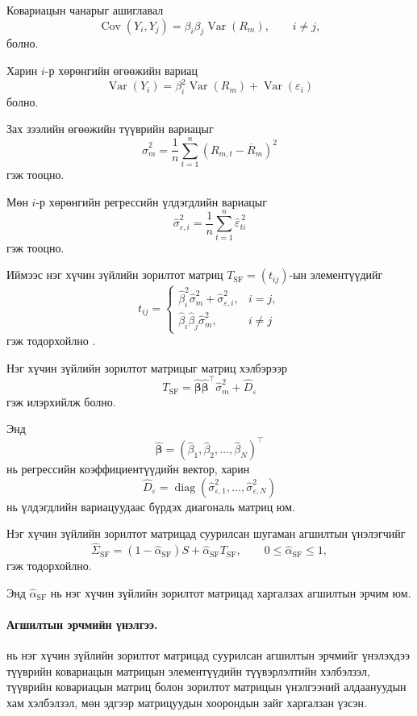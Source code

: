Ковариацын чанарыг ашиглавал
\[
\operatorname{Cov}(Y_i,Y_j)
=
\beta_i\beta_j\operatorname{Var}(R_m),
\qquad i\neq j,
\]
болно.

Харин $i$-р хөрөнгийн өгөөжийн вариац
\[
\operatorname{Var}(Y_i)
=
\beta_i^2\operatorname{Var}(R_m)
+
\operatorname{Var}(\varepsilon_i)
\]
болно.

Зах зээлийн өгөөжийн түүврийн вариацыг
\[
\widehat{\sigma}_m^2
=
\frac{1}{n}
\sum_{t=1}^{n}
(R_{m,t}-\overline{R}_m)^2
\]
гэж тооцно.

Мөн $i$-р хөрөнгийн регрессийн үлдэгдлийн
вариацыг
\[
\widehat{\sigma}_{\varepsilon,i}^{2}
=
\frac{1}{n}
\sum_{t=1}^{n}
\widehat{\varepsilon}_{ti}^{\,2}
\]
гэж тооцно.

Иймээс нэг хүчин зүйлийн зорилтот матриц
$T_{\mathrm{SF}}=(t_{ij})$-ын элементүүдийг
\[
t_{ij}
=
\begin{cases}
	\widehat{\beta}_i^2\widehat{\sigma}_m^2
	+
	\widehat{\sigma}_{\varepsilon,i}^{2},
	& i=j,\\[0.4em]
	\widehat{\beta}_i\widehat{\beta}_j
	\widehat{\sigma}_m^2,
	& i\neq j
\end{cases}
\]
гэж тодорхойлно \citep{ledoitwolf2003}.

Нэг хүчин зүйлийн зорилтот матрицыг матриц
хэлбэрээр
\[
T_{\mathrm{SF}}
=
\widehat{\boldsymbol{\beta}}
\widehat{\boldsymbol{\beta}}^{\top}
\widehat{\sigma}_m^2
+
\widehat D_{\varepsilon}
\]
гэж илэрхийлж болно.

Энд
\[
\widehat{\boldsymbol{\beta}}
=
(\widehat{\beta}_1,
\widehat{\beta}_2,
\ldots,
\widehat{\beta}_N)^{\top}
\]
нь регрессийн коэффициентүүдийн вектор, харин
\[
\widehat D_{\varepsilon}
=
\operatorname{diag}
\left(
\widehat{\sigma}_{\varepsilon,1}^{2},
\ldots,
\widehat{\sigma}_{\varepsilon,N}^{2}
\right)
\]
нь үлдэгдлийн вариацуудаас бүрдэх диагональ
матриц юм.

Нэг хүчин зүйлийн зорилтот матрицад суурилсан
шугаман агшилтын үнэлэгчийг
\[
\widehat{\Sigma}_{\mathrm{SF}}
=
(1-\widehat{\alpha}_{\mathrm{SF}})S
+
\widehat{\alpha}_{\mathrm{SF}}T_{\mathrm{SF}},
\qquad
0\leq\widehat{\alpha}_{\mathrm{SF}}\leq1,
\]
гэж тодорхойлно.

Энд $\widehat{\alpha}_{\mathrm{SF}}$ нь нэг хүчин
зүйлийн зорилтот матрицад харгалзах агшилтын
эрчим юм.

\paragraph{Агшилтын эрчмийн үнэлгээ.}

\citet{ledoitwolf2003} нь нэг хүчин зүйлийн
зорилтот матрицад суурилсан агшилтын эрчмийг
үнэлэхдээ түүврийн ковариацын матрицын
элементүүдийн түүвэрлэлтийн хэлбэлзэл,
түүврийн ковариацын матриц болон зорилтот
матрицын үнэлгээний алдаануудын хам хэлбэлзэл,
мөн эдгээр матрицуудын хоорондын зайг
харгалзан үзсэн.

